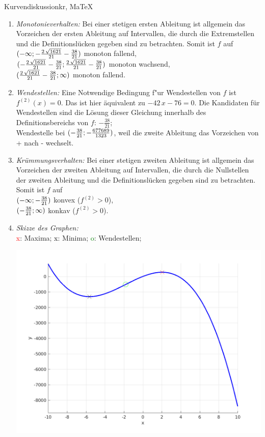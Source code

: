 \begin{MAufgabe}{Kurvendiskussion}{kr, MaTeX}
\begin{enumerate}
 \item \emph{Monotonieverhalten:} 
 Bei einer stetigen ersten Ableitung ist allgemein das Vorzeichen der ersten Ableitung auf Intervallen, die durch die Extremstellen und die Definitionsl\"ucken gegeben sind zu betrachten. Somit ist $f$ auf \\ 
 $(-\infty; - \frac{2\, \sqrt{1621}}{21} - \frac{38}{21})$ monoton fallend, \\ 
 $( - \frac{2\, \sqrt{1621}}{21} - \frac{38}{21};\frac{2\, \sqrt{1621}}{21} - \frac{38}{21})$ monoton  wachsend, \\ 
 $(\frac{2\, \sqrt{1621}}{21} - \frac{38}{21}; \infty)$ monoton fallend. \\ 
 \item \emph{Wendestellen:} 
 Eine Notwendige Bedingung f"ur Wendestellen von $f$ ist $f^{(2)}(x)=0$. 
 Das ist hier \"aquivalent zu $ - 42\, x - 76=0$. 
 Die Kandidaten f\"ur Wendestellen sind die L\"osung dieser Gleichung innerhalb des Definitionsbereichs von $f$: $- \frac{38}{21}$; \\ 
 Wendestelle bei $(- \frac{38}{21};- \frac{677689}{1323})$, weil die zweite Ableitung das Vorzeichen von + nach - wechselt. \\ 
 \item \emph{Kr\"ummungsverhalten:} 
 Bei einer stetigen zweiten Ableitung ist allgemein das Vorzeichen der zweiten Ableitung auf Intervallen, die durch die Nullstellen der zweiten Ableitung und die Definitionsl\"ucken gegeben sind zu betrachten. 
 Somit ist $f$ auf \\ 
 $(-\infty ;- \frac{38}{21})$  konvex ($f^{(2)}>0$), \\ 
 $(- \frac{38}{21}; \infty)$  konkav ($f^{(2)}>0$). \\ 
 \item \emph{Skizze des Graphen:} \\ 
 {\textcolor{red} x}: Maxima; {\textcolor{black} x}: Minima; {\textcolor{green} o}: Wendestellen; 
  \begin{center}
  \includegraphics[width=0.8\linewidth]{Abb_zur_Ag_autogenerated_fractions_6.png} \end{center}
  
 \end{enumerate}
 \else\relax\fi
  \end{MAufgabe}